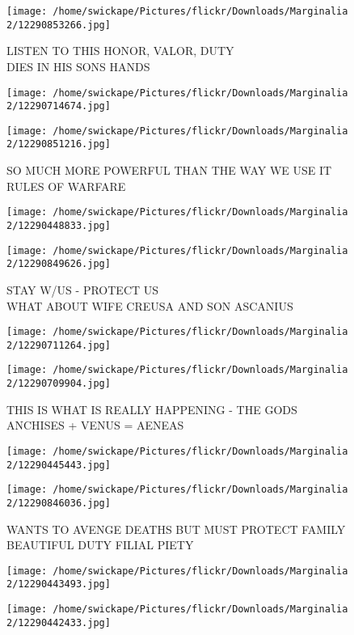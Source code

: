 \documentclass[10pt,letterpaper]{article}
\begin{document}
\vspace{0.25in}
\texttt{[image: /home/swickape/Pictures/flickr/Downloads/Marginalia 2/12290853266.jpg]}

LISTEN TO THIS HONOR, VALOR, DUTY\\
DIES IN HIS SONS HANDS
\pagebreak

\texttt{[image: /home/swickape/Pictures/flickr/Downloads/Marginalia 2/12290714674.jpg]}

\vspace{0.25in}
\texttt{[image: /home/swickape/Pictures/flickr/Downloads/Marginalia 2/12290851216.jpg]}

SO MUCH MORE POWERFUL THAN THE WAY WE USE IT\\
RULES OF WARFARE
\pagebreak

\texttt{[image: /home/swickape/Pictures/flickr/Downloads/Marginalia 2/12290448833.jpg]}

\vspace{0.25in}
\texttt{[image: /home/swickape/Pictures/flickr/Downloads/Marginalia 2/12290849626.jpg]}

STAY W/US {-} PROTECT US\\
WHAT ABOUT WIFE CREUSA AND SON ASCANIUS
\pagebreak

\texttt{[image: /home/swickape/Pictures/flickr/Downloads/Marginalia 2/12290711264.jpg]}

\vspace{0.25in}
\texttt{[image: /home/swickape/Pictures/flickr/Downloads/Marginalia 2/12290709904.jpg]}

THIS IS WHAT IS REALLY HAPPENING {-} THE GODS\\
ANCHISES + VENUS = AENEAS
\pagebreak

\texttt{[image: /home/swickape/Pictures/flickr/Downloads/Marginalia 2/12290445443.jpg]}

\vspace{0.25in}
\texttt{[image: /home/swickape/Pictures/flickr/Downloads/Marginalia 2/12290846036.jpg]}

WANTS TO AVENGE DEATHS BUT MUST PROTECT FAMILY\\
BEAUTIFUL DUTY FILIAL PIETY
\pagebreak

\texttt{[image: /home/swickape/Pictures/flickr/Downloads/Marginalia 2/12290443493.jpg]}

\vspace{0.25in}
\texttt{[image: /home/swickape/Pictures/flickr/Downloads/Marginalia 2/12290442433.jpg]}
\end{document}

